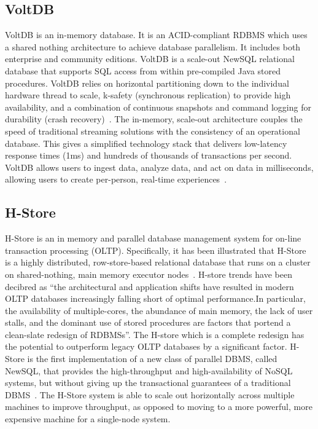 \subsection{VoltDB}

VoltDB is an in-memory database. It is an ACID-compliant RDBMS which
uses a shared nothing architecture to achieve database parallelism. It
includes both enterprise and community editions. VoltDB is a scale-out
NewSQL relational database that supports SQL access from within
pre-compiled Java stored procedures.  VoltDB relies on horizontal
partitioning down to the individual hardware thread to scale, k-safety
(synchronous replication) to provide high availability, and a
combination of continuous snapshots and command logging for durability
(crash recovery)~\cite{www-voltdb}. The in-memory, scale-out
architecture couples the speed of traditional streaming solutions with
the consistency of an operational database. This gives a simplified
technology stack that delivers low-latency response times (1ms) and
hundreds of thousands of transactions per second. VoltDB allows users
to ingest data, analyze data, and act on data in milliseconds,
allowing users to create per-person, real-time
experiences~\cite{www-voltdb}.

\subsection{H-Store}

H-Store is an in memory and parallel database management system for
on-line transaction processing (OLTP). Specifically, it has been
illustrated that H-Store is a highly distributed, row-store-based
relational database that runs on a cluster on shared-nothing, main
memory executor nodes~\cite{www-Hstore}.  H-store trends have been
decibred as ``the architectural and application shifts have resulted
in modern OLTP databases increasingly falling short of optimal
performance.In particular, the availability of multiple-cores, the
abundance of main memory, the lack of user stalls, and the dominant
use of stored procedures are factors that portend a clean-slate
redesign of RDBMSs''\cite{kallman2008}.  The H-store which is a
complete redesign has the potential to outperform legacy OLTP
databases by a significant factor.  H-Store is the first
implementation of a new class of parallel DBMS, called NewSQL, that
provides the high-throughput and high-availability of NoSQL systems,
but without giving up the transactional guarantees of a traditional
DBMS~\cite{www-Hstorewiki}. The H-Store system is able to scale out
horizontally across multiple machines to improve throughput, as
opposed to moving to a more powerful, more expensive machine for a
single-node system.

